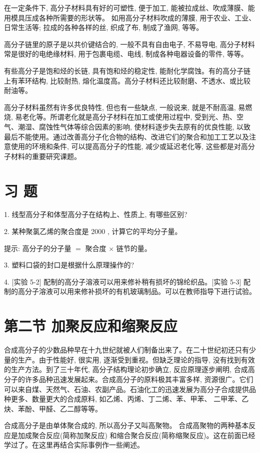\documentclass[10pt]{article}
\begin{document}
在一定条件下, 高分子材料具有好的可塑性, 便于加工, 能被拉成丝、吹成薄膜、能用模具压成各种所需要的形状等。 如用高分子材料吹成的薄膜, 用于农业、工业、日常生活等; 拉成的各种各样的丝, 织成了布, 制成了渔网, 等等。

高分子链里的原子是以共价键结合的, 一般不具有自由电子, 不易导电, 高分子材料常是很好的电绝缘材料, 用于包裹电缆、电线, 制成各种电器设备的零件, 等等。

有些高分子是饱和烃的长链, 具有饱和烃的稳定性, 能耐化学腐蚀。有的高分子链上有苯环结构, 比较耐热, 熔化温度高。高分子材料还比较耐磨、不透水、或比较耐油等。

高分子材料虽然有许多优良特性, 但也有一些缺点, 一般说来, 就是不耐高温, 易燃烧, 易老化等。所谓老化就是高分子材料在加工或使用过程中, 受到光、热、空气、潮湿、腐蚀性气体等综合因素的影响, 使材料逐步失去原有的优良性能, 以致最后不能使用。通过改善高分子化合物的结构、改进它们的聚合和加工工艺以及注意使用的环境和条件, 可以提高高分子的性能, 减少或延迟老化等, 这些都是对高分子材料的重要研究课题。

\section*{习 题}

1. 线型高分子和体型高分子在结构上、性质上, 有哪些区别?

2. 某种聚氯乙烯的聚合度是 2000 , 计算它的平均分子量。

提示: 高分子的分子量 \(=\) 聚合度 \(\times\) 链节的量。

3. 塑料口袋的封口是根据什么原理操作的?

4. [实验 5-2] 配制的高分子溶液可以用来修补稍有损坏的锦纶织品。[实验 5-3] 配制的高分子溶液可以用来修补损坏的有机玻璃制品。可以在教师指导下进行试验。

\section*{第二节 加聚反应和缩聚反应}

合成高分子的少数品种早在十九世纪就被人们制备出来了。在二十世纪初还只有少量的生产。由于性能好, 很实用, 逐渐受到重视。但缺乏理论的指导, 没有找到有效的生产方法。到了三十年代, 高分子结构理论初步确立, 反应原理逐步阐明, 合成高分子的许多品种迅速发展起来。合成高分子的原料极其丰富多样, 资源很广。它们可以来自煤、天然气、石油、农副产品。石油化工的迅速发展为高分子合成提供品种更多、数量更大的合成原料, 如乙烯、丙烯、丁二烯、苯、甲苯、 二甲苯、乙炔、苯酚、甲醛、乙二醇等等。

合成高分子是由单体聚合成的, 所以高分子又叫高聚物。 合成高聚物的两种基本反应是加成聚合反应(简称加聚反应) 和缩合聚合反应(简称缩聚反应)。这在前面已经学过了。在这里再结合实际事例作一些阐述。
\end{document}
